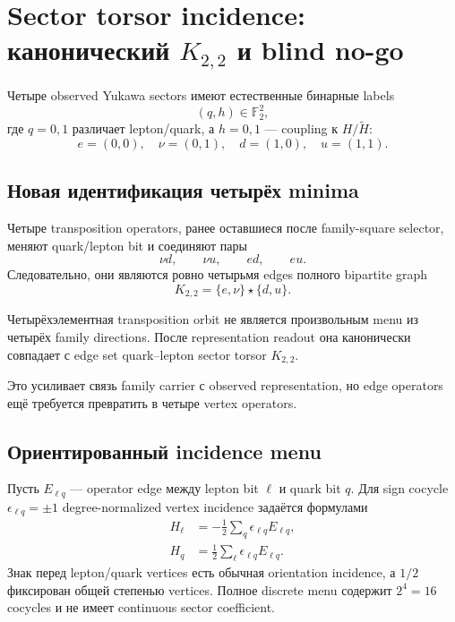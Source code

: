 \chapter{Sector torsor incidence: канонический \texorpdfstring{\(K_{2,2}\)}{K2,2} и blind no-go}

Четыре observed Yukawa sectors имеют естественные бинарные labels
\begin{equation}
 (q,h)\in\mathbb F_2^2,
\end{equation}
где \(q=0,1\) различает lepton/quark, а \(h=0,1\) --- coupling к
\(H/\widetilde H\):
\begin{equation}
 e=(0,0),\quad\nu=(0,1),\quad d=(1,0),\quad u=(1,1).
\end{equation}

\section{Новая идентификация четырёх minima}

Четыре transposition operators, ранее оставшиеся после family-square
selector, меняют quark/lepton bit и соединяют пары
\begin{equation}
 \nu d,\qquad\nu u,\qquad ed,\qquad eu.
\end{equation}
Следовательно, они являются ровно четырьмя edges полного bipartite graph
\begin{equation}
 K_{2,2}=\{e,\nu\}\star\{d,u\}.
\end{equation}

\begin{theorem}
Четырёхэлементная transposition orbit не является произвольным menu из
четырёх family directions. После representation readout она канонически
совпадает с edge set quark--lepton sector torsor \(K_{2,2}\).
\end{theorem}

Это усиливает связь family carrier с observed representation, но edge
operators ещё требуется превратить в четыре vertex operators.

\section{Ориентированный incidence menu}

Пусть \(E_{\ell q}\) --- operator edge между lepton bit \(\ell\) и quark bit
\(q\). Для sign cocycle \(\epsilon_{\ell q}=\pm1\) degree-normalized vertex
incidence задаётся формулами
\begin{align}
 H_{\ell}&=-\frac12\sum_q\epsilon_{\ell q}E_{\ell q},\\
 H_q&=\frac12\sum_\ell\epsilon_{\ell q}E_{\ell q}.
\end{align}
Знак перед lepton/quark vertices есть обычная orientation incidence, а
\(1/2\) фиксирован общей степенью vertices. Полное discrete menu содержит
\(2^4=16\) cocycles и не имеет continuous sector coefficient.

